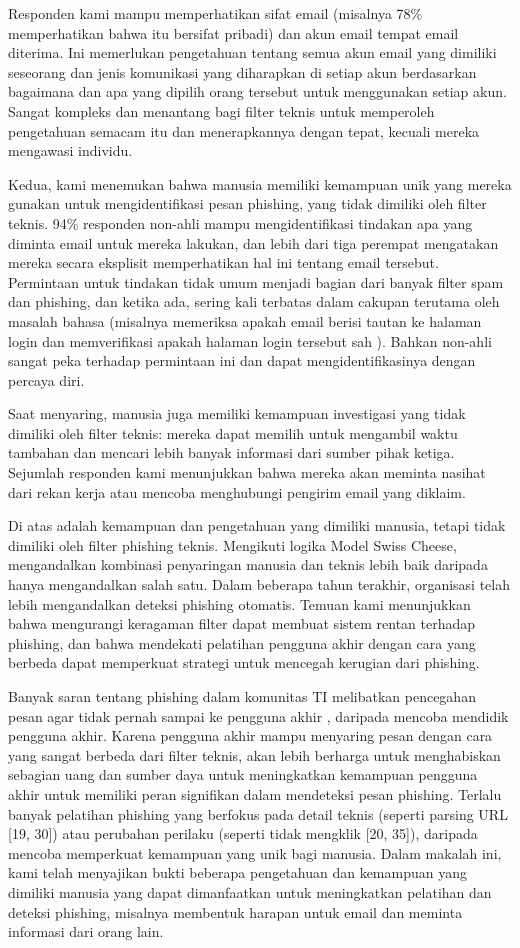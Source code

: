 \documentclass[lettersize,journal]{IEEEtran}
\begin{document}
Responden kami mampu memperhatikan sifat email (misalnya 78\% memperhatikan
bahwa itu bersifat pribadi) dan akun email tempat email diterima. Ini
memerlukan pengetahuan tentang semua akun email yang dimiliki seseorang dan
jenis komunikasi yang diharapkan di setiap akun berdasarkan bagaimana dan apa
yang dipilih orang tersebut untuk menggunakan setiap akun. Sangat kompleks dan
menantang bagi filter teknis untuk memperoleh pengetahuan semacam itu dan
menerapkannya dengan tepat, kecuali mereka mengawasi individu.

Kedua, kami menemukan bahwa manusia memiliki kemampuan unik yang mereka gunakan
untuk mengidentifikasi pesan phishing, yang tidak dimiliki oleh filter teknis.
94\% responden non-ahli mampu mengidentifikasi tindakan apa yang diminta email
untuk mereka lakukan, dan lebih dari tiga perempat mengatakan mereka secara
eksplisit memperhatikan hal ini tentang email tersebut. Permintaan untuk
tindakan tidak umum menjadi bagian dari banyak filter spam dan phishing, dan
ketika ada, sering kali terbatas dalam cakupan terutama oleh masalah bahasa
(misalnya memeriksa apakah email berisi tautan ke halaman login dan
memverifikasi apakah halaman login tersebut sah \cite{duatiga}). Bahkan
non-ahli sangat peka terhadap permintaan ini dan dapat mengidentifikasinya
dengan percaya diri.

Saat menyaring, manusia juga memiliki kemampuan investigasi yang tidak dimiliki
oleh filter teknis: mereka dapat memilih untuk mengambil waktu tambahan dan
mencari lebih banyak informasi dari sumber pihak ketiga. Sejumlah responden
kami menunjukkan bahwa mereka akan meminta nasihat dari rekan kerja atau
mencoba menghubungi pengirim email yang diklaim.

Di atas adalah kemampuan dan pengetahuan yang dimiliki manusia, tetapi tidak
dimiliki oleh filter phishing teknis. Mengikuti logika Model Swiss Cheese,
mengandalkan kombinasi penyaringan manusia dan teknis lebih baik daripada hanya
mengandalkan salah satu. Dalam beberapa tahun terakhir, organisasi telah lebih
mengandalkan deteksi phishing otomatis. Temuan kami menunjukkan bahwa
mengurangi keragaman filter dapat membuat sistem rentan terhadap phishing, dan
bahwa mendekati pelatihan pengguna akhir dengan cara yang berbeda dapat
memperkuat strategi untuk mencegah kerugian dari phishing.

Banyak saran tentang phishing dalam komunitas TI melibatkan pencegahan pesan
agar tidak pernah sampai ke pengguna akhir \cite{satuempat}, daripada mencoba
mendidik pengguna akhir. Karena pengguna akhir mampu menyaring pesan dengan
cara yang sangat berbeda dari filter teknis, akan lebih berharga untuk
menghabiskan sebagian uang dan sumber daya untuk meningkatkan kemampuan
pengguna akhir untuk memiliki peran signifikan dalam mendeteksi pesan phishing.
Terlalu banyak pelatihan phishing yang berfokus pada detail teknis (seperti
parsing URL [19, 30]) atau perubahan perilaku (seperti tidak mengklik [20,
    35]), daripada mencoba memperkuat kemampuan yang unik bagi manusia. Dalam
makalah ini, kami telah menyajikan bukti beberapa pengetahuan dan kemampuan
yang dimiliki manusia yang dapat dimanfaatkan untuk meningkatkan pelatihan dan
deteksi phishing, misalnya membentuk harapan untuk email dan meminta informasi
dari orang lain.
\end{document}
